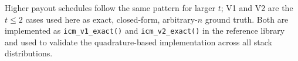 \documentclass[11pt]{article}
\begin{document}
Higher payout schedules follow the same pattern for larger $t$; V1 and V2
are the $t \le 2$ cases used here as exact, closed-form, arbitrary-$n$
ground truth. Both are implemented as \texttt{icm\_v1\_exact()} and
\texttt{icm\_v2\_exact()} in the reference library and used to validate the
quadrature-based implementation across all stack distributions.



\end{document}
